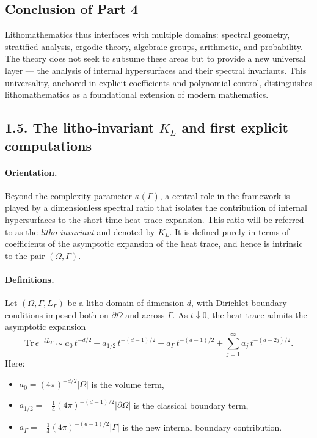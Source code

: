 \subsection{Conclusion of Part 4}

Lithomathematics thus interfaces with multiple domains: 
spectral geometry, stratified analysis, ergodic theory, 
algebraic groups, arithmetic, and probability. 
The theory does not seek to subsume these areas but to provide 
a new universal layer --- the analysis of internal hypersurfaces 
and their spectral invariants. 
This universality, anchored in explicit coefficients 
and polynomial control, distinguishes lithomathematics 
as a foundational extension of modern mathematics. 

\subsection*{1.5. The litho-invariant $K_L$ and first explicit computations}

\paragraph{Orientation.}
Beyond the complexity parameter $\kappa(\Gamma)$, a central role in the framework
is played by a dimensionless spectral ratio that isolates the
contribution of internal hypersurfaces to the short-time heat trace expansion.
This ratio will be referred to as the \emph{litho-invariant} and denoted by $K_L$.
It is defined purely in terms of coefficients of the asymptotic expansion
of the heat trace, and hence is intrinsic to the pair $(\Omega,\Gamma)$.

\paragraph{Definitions.}
Let $(\Omega,\Gamma,L_\Gamma)$ be a litho-domain of dimension $d$, with
Dirichlet boundary conditions imposed both on $\partial\Omega$ and across $\Gamma$.
As $t \downarrow 0$, the heat trace admits the asymptotic expansion
\begin{equation}\label{eq:heat-trace-asympt}
\mathrm{Tr}\,e^{-tL_\Gamma} \sim
a_0\, t^{-d/2} + a_{1/2}\, t^{-(d-1)/2} + a_\Gamma\, t^{-(d-1)/2}
+ \sum_{j=1}^\infty a_{j}\,t^{-(d-2j)/2}.
\end{equation}
Here:
\begin{itemize}
\item $a_0 = (4\pi)^{-d/2}|\Omega|$ is the volume term,
\item $a_{1/2} = -\tfrac14 (4\pi)^{-(d-1)/2}|\partial\Omega|$ is the classical boundary term,
\item $a_\Gamma = -\tfrac14 (4\pi)^{-(d-1)/2}|\Gamma|$ is the new internal boundary contribution.
\end{itemize}

